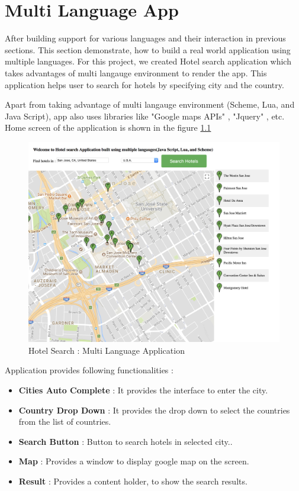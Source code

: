 \chapter{Multi Language App}

After building support for various languages and their interaction in previous sections. This section demonstrate, how to build a real world application using multiple languages. For this project, we created Hotel search application which takes advantages of multi langauge environment to render the app. This application helps user to search for hotels by specifying city and the country. 

Apart from taking advantage of multi langauge environment (Scheme, Lua, and Java Script), app also uses libraries like "Google maps APIs" \cite{googlemapsapi}, "Jquery" \cite{jquery} , etc. Home screen of the application is shown in the figure \ref{fig:multilangapp}

\begin{figure}[H]
	\begin{center}
		\includegraphics[width=\linewidth]{./images/multilangapp.png}
	\end{center}
	\caption{Hotel Search : Multi Language Application}
	\label{fig:multilangapp}
\end{figure}

Application provides following functionalities : 
\begin{itemize}
	\item {\textbf{Cities Auto Complete} : It provides the interface to enter the city. }
	\item {\textbf{Country Drop Down} : It provides the drop down to select the countries from the list of countries.}
	\item {\textbf{Search Button} : Button to search hotels in selected city..}
	\item {\textbf{Map} : Provides a window to display google map on the screen.}
	\item {\textbf{Result} : Provides a content holder, to show the search results.}
\end{itemize}

